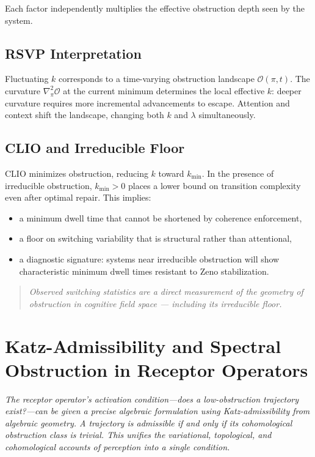 \documentclass[12pt,a4paper]{article}
\begin{document}
Each factor independently multiplies the effective obstruction depth seen by the system.

\subsection{RSVP Interpretation}

Fluctuating $k$ corresponds to a time-varying obstruction landscape $\mathcal{O}(\pi, t)$. The curvature $\nabla^2_\pi \mathcal{O}$ at the current minimum determines the local effective $k$: deeper curvature requires more incremental advancements to escape. Attention and context shift the landscape, changing both $k$ and $\lambda$ simultaneously.

\subsection{CLIO and Irreducible Floor}

CLIO minimizes obstruction, reducing $k$ toward $k_{\min}$. In the presence of irreducible obstruction, $k_{\min} > 0$ places a lower bound on transition complexity even after optimal repair. This implies:

\begin{itemize}[noitemsep]
\item a minimum dwell time that cannot be shortened by coherence enforcement,
\item a floor on switching variability that is structural rather than attentional,
\item a diagnostic signature: systems near irreducible obstruction will show characteristic minimum dwell times resistant to Zeno stabilization.
\end{itemize}

\begin{quote}
\emph{Observed switching statistics are a direct measurement of the geometry of obstruction in cognitive field space --- including its irreducible floor.}
\end{quote}

\section{Katz-Admissibility and Spectral Obstruction in Receptor Operators}
\label{sec:katz}

\textit{The receptor operator's activation condition---does a low-obstruction trajectory exist?---can be given a precise algebraic formulation using Katz-admissibility from algebraic geometry. A trajectory is admissible if and only if its cohomological obstruction class is trivial. This unifies the variational, topological, and cohomological accounts of perception into a single condition.}
\end{document}
